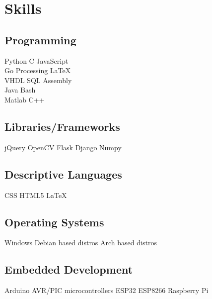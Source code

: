 \documentclass[]{plushcv}
\begin{document}
\begin{minipage}[t]{0.3\textwidth}


  \section{Skills}
  \subsection{Programming}
  \sectionsep
  Python \textbullet{} C \textbullet{} JavaScript  \\ Go \textbullet{} Processing \textbullet{} LaTeX \\
  \sectionsep
  VHDL \textbullet{} SQL \textbullet{} Assembly \\ Java \textbullet{} Bash \\
  \sectionsep
  Matlab \textbullet{} C++ \\
  \sectionsep
  \sectionsep
  \subsection{Libraries/Frameworks}
  \sectionsep
  jQuery \textbullet{} OpenCV \textbullet{} Flask \textbullet{} Django \textbullet{} Numpy \\
  \sectionsep
  \sectionsep
  \subsection{Descriptive Languages}
  \sectionsep
  CSS \textbullet{} HTML5 \textbullet{} \LaTeX
  \sectionsep
  \subsection{Operating Systems}
  \sectionsep
  Windows \textbullet{} Debian based distros \textbullet{} Arch based distros \\
  \sectionsep
  \sectionsep
  \subsection{Embedded Development}
  \sectionsep
  Arduino \textbullet{} AVR/PIC microcontrollers \textbullet{} ESP32 \textbullet{} ESP8266 \textbullet{} Raspberry Pi \\

\end{minipage}
\end{document}
